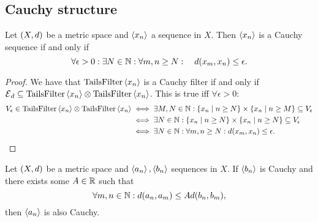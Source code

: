 \subsection{Cauchy structure}

\begin{lemma} \label{metricCauchySequence}
Let $\sSet{X,d}$ be a metric space and $\left\langle x_n \right\rangle$ a sequence in $X$. Then $\left\langle x_n \right\rangle$ is a Cauchy sequence \textup{if and only if}
\[ \forall \epsilon >0: \exists N\in\mathbb{N}: \forall m,n \geq N: \quad d(x_m, x_n)\leq \epsilon. \]
\end{lemma}
\begin{proof}
We have that $\operatorname{TailsFilter}\left\langle x_n \right\rangle$ is a Cauchy filter \textup{if and only if} $\operatorname{\mathcal{E}}_d \subseteq \operatorname{TailsFilter}\left\langle x_n \right\rangle\otimes \operatorname{TailsFilter}\left\langle x_n \right\rangle$. This is true iff $\forall \epsilon>0$:
\begin{align*}
V_\epsilon \in \TailsFilter\seq{x_n}\otimes \TailsFilter\seq{x_n} &\iff \exists M,N\in\N: \setbuilder{x_n}{n\geq N}\times\setbuilder{x_n}{n\geq M} \subseteq V_\epsilon \\
&\iff \exists N\in\N: \setbuilder{x_n}{n\geq N}\times\setbuilder{x_n}{n\geq N} \subseteq V_\epsilon \\
&\iff \exists N\in\N: \forall m,n \geq N: d(x_m, x_n)\leq \epsilon.
\end{align*}
\end{proof}

\begin{lemma} \label{CauchyCriterion}
Let $\sSet{X,d}$ be a metric space and $\left\langle a_n \right\rangle, \left\langle b_n \right\rangle$ sequences in $X$. If $\left\langle b_n \right\rangle$ is Cauchy and there exists some $A\in\mathbb{R}$ such that
\[ \forall m,n\in\mathbb{N}: d(a_n,a_m) \leq A d(b_n,b_m), \]
then $\left\langle a_n \right\rangle$ is also Cauchy.
\end{lemma}

